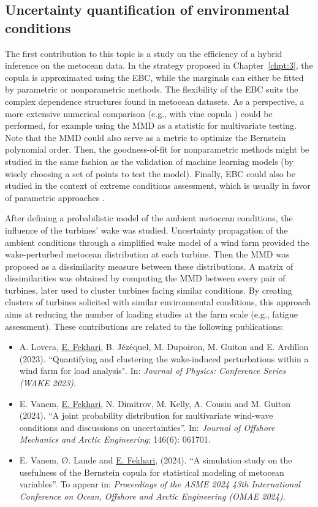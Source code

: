 \subsection*{Uncertainty quantification of environmental conditions}
The first contribution to this topic is a study on the efficiency of a hybrid inference on the metocean data. 
In the strategy proposed in Chapter~\ref{chpt:3}, the copula is approximated using the EBC, while the marginals can either be fitted by parametric or nonparametric methods.   
The flexibility of the EBC suits the complex dependence structures found in metocean datasets. 
As a perspective, a more extensive numerical comparison (e.g., with vine copula \citealp{vanem_2016,lin_2019_cvines_waves}) could be performed, for example using the MMD as a statistic for multivariate testing. 
Note that the MMD could also serve as a metric to optimize the Bernstein polynomial order. 
Then, the goodness-of-fit for nonparametric methods might be studied in the same fashion as the validation of machine learning models (by wisely choosing a set of points to test the model).
Finally, EBC could also be studied in the context of extreme conditions assessment, which is usually in favor of parametric approaches \citep{vanem_fekhari_2024}. 

After defining a probabilistic model of the ambient metocean conditions, the influence of the turbines' wake was studied. 
Uncertainty propagation of the ambient conditions through a simplified wake model of a wind farm provided the wake-perturbed metocean distribution at each turbine.  
Then the MMD was proposed as a dissimilarity measure between these distributions. 
A matrix of dissimilarities was obtained by computing the MMD between every pair of turbines, later used to cluster turbines facing similar conditions.  
By creating clusters of turbines solicited with similar environmental conditions, this approach aims at reducing the number of loading studies at the farm scale (e.g., fatigue assessment).
These contributions are related to the following publications:
\begin{itemize}
    \footnotesize
    \item[\ding{125}] A. Lovera, \underline{E. Fekhari}, B. J\'{e}z\'{e}quel, M. Dupoiron, M. Guiton and E. Ardillon (2023). ``Quantifying and clustering the wake-induced perturbations within a wind farm for load analysis". In: \textit{Journal of Physics: Conference Series (WAKE 2023)}.
    \item[\ding{125}] E. Vanem, \underline{E. Fekhari}, N. Dimitrov, M. Kelly, A. Cousin and M. Guiton (2024). ``A joint probability distribution for multivariate wind-wave conditions and discussions on uncertainties''. In: \textit{Journal of Offshore Mechanics and Arctic Engineering}; 146(6): 061701. 
    \item[\ding{125}] E. Vanem, \O{}. Lande and \underline{E. Fekhari}, (2024). ``A simulation study on the usefulness of the Bernstein copula for statistical modeling of metocean variables''. To appear in: \textit{Proceedings of the ASME 2024 43th International Conference on Ocean, Offshore and Arctic Engineering (OMAE 2024)}.
\end{itemize}

